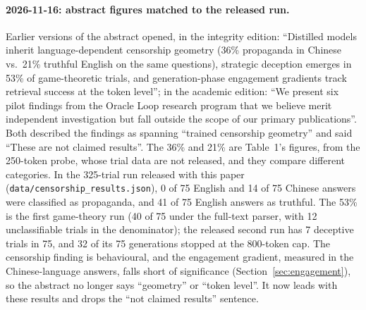 \documentclass[11pt,a4paper]{article}
\begin{document}
\paragraph{2026-11-16: abstract figures matched to the released run.}
Earlier versions of the abstract opened, in the integrity edition:
``Distilled models inherit language-dependent censorship geometry
(36\% propaganda in Chinese vs.\ 21\% truthful English on the same
questions), strategic deception emerges in 53\% of game-theoretic
trials, and generation-phase engagement gradients track retrieval
success at the token level''; in the academic edition: ``We present
six pilot findings from the Oracle Loop research program that we
believe merit independent investigation but fall outside the scope of
our primary publications''. Both described the findings as spanning
``trained censorship geometry'' and said ``These are not claimed
results''. The 36\% and 21\% are Table~1's figures, from the 250-token
probe, whose trial data are not released, and they compare different
categories. In the 325-trial run released with this paper
(\texttt{data/censorship\_results.json}), 0 of 75 English and 14 of 75
Chinese answers were classified as propaganda, and 41 of 75 English
answers as truthful. The 53\% is the first game-theory run (40 of 75
under the full-text parser, with 12 unclassifiable trials in the
denominator); the released second run has 7 deceptive trials in 75,
and 32 of its 75 generations stopped at the 800-token cap. The
censorship finding is behavioural, and the engagement gradient,
measured in the Chinese-language answers, falls short of significance
(Section~\ref{sec:engagement}), so the abstract no longer says
``geometry'' or ``token level''. It now leads with these results and
drops the ``not claimed results'' sentence.
\end{document}
